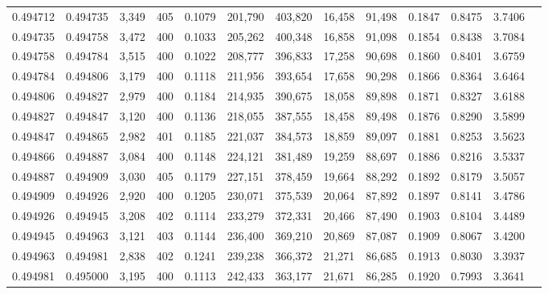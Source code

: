 \begin{tabular}{rrrrrrrrrrrrr}
0.494712 & 0.494735 & 3,349 & 405 &                                     0.1079 & 201,790 & 403,820 &  16,458 &  91,498 & 0.1847 & 0.8475 & 3.7406 \\
0.494735 & 0.494758 & 3,472 & 400 &                                     0.1033 & 205,262 & 400,348 &  16,858 &  91,098 & 0.1854 & 0.8438 & 3.7084 \\
0.494758 & 0.494784 & 3,515 & 400 &                                     0.1022 & 208,777 & 396,833 &  17,258 &  90,698 & 0.1860 & 0.8401 & 3.6759 \\
0.494784 & 0.494806 & 3,179 & 400 &                                     0.1118 & 211,956 & 393,654 &  17,658 &  90,298 & 0.1866 & 0.8364 & 3.6464 \\
0.494806 & 0.494827 & 2,979 & 400 &                                     0.1184 & 214,935 & 390,675 &  18,058 &  89,898 & 0.1871 & 0.8327 & 3.6188 \\
0.494827 & 0.494847 & 3,120 & 400 &                                     0.1136 & 218,055 & 387,555 &  18,458 &  89,498 & 0.1876 & 0.8290 & 3.5899 \\
0.494847 & 0.494865 & 2,982 & 401 &                                     0.1185 & 221,037 & 384,573 &  18,859 &  89,097 & 0.1881 & 0.8253 & 3.5623 \\
0.494866 & 0.494887 & 3,084 & 400 &                                     0.1148 & 224,121 & 381,489 &  19,259 &  88,697 & 0.1886 & 0.8216 & 3.5337 \\
0.494887 & 0.494909 & 3,030 & 405 &                                     0.1179 & 227,151 & 378,459 &  19,664 &  88,292 & 0.1892 & 0.8179 & 3.5057 \\
0.494909 & 0.494926 & 2,920 & 400 &                                     0.1205 & 230,071 & 375,539 &  20,064 &  87,892 & 0.1897 & 0.8141 & 3.4786 \\
0.494926 & 0.494945 & 3,208 & 402 &                                     0.1114 & 233,279 & 372,331 &  20,466 &  87,490 & 0.1903 & 0.8104 & 3.4489 \\
0.494945 & 0.494963 & 3,121 & 403 &                                     0.1144 & 236,400 & 369,210 &  20,869 &  87,087 & 0.1909 & 0.8067 & 3.4200 \\
0.494963 & 0.494981 & 2,838 & 402 &                                     0.1241 & 239,238 & 366,372 &  21,271 &  86,685 & 0.1913 & 0.8030 & 3.3937 \\
0.494981 & 0.495000 & 3,195 & 400 &                                     0.1113 & 242,433 & 363,177 &  21,671 &  86,285 & 0.1920 & 0.7993 & 3.3641 \\

\end{tabular}
